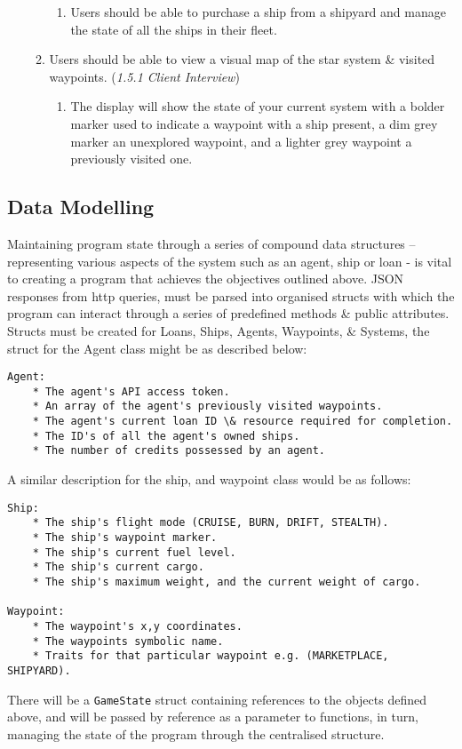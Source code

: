 \begin{enumerate}
\begin{enumerate}
\begin{enumerate}
                \item Users should be able to purchase a ship from a shipyard and manage the state of all the ships in their fleet.
            \end{enumerate}
        \item Users should be able to view a visual map of the star system \& visited waypoints. (\textit{1.5.1 Client Interview})
            \begin{enumerate}
                \item The display will show the state of your current system with a bolder marker  used to indicate a waypoint with a ship present, a dim grey marker an unexplored waypoint, and a lighter grey waypoint a previously visited one.
            \end{enumerate}
    \end{enumerate}
    \end{enumerate}

\subsection{Data Modelling}
Maintaining program state through a series of compound data structures – representing various aspects of the system such as an agent, ship or loan - is vital to creating a program that achieves the objectives outlined above. JSON responses from http queries, must be parsed into organised structs with which the program can interact through a series of predefined methods \& public attributes. Structs must be created for Loans, Ships, Agents, Waypoints, \& Systems, the struct for the Agent class might be as described below:
\begin{lstlisting}
Agent:
    * The agent's API access token.
    * An array of the agent's previously visited waypoints.
    * The agent's current loan ID \& resource required for completion.
    * The ID's of all the agent's owned ships.
    * The number of credits possessed by an agent.
\end{lstlisting}
A similar description for the ship, and waypoint class would be as follows:
\begin{lstlisting}
Ship:
    * The ship's flight mode (CRUISE, BURN, DRIFT, STEALTH).
    * The ship's waypoint marker.
    * The ship's current fuel level.
    * The ship's current cargo.
    * The ship's maximum weight, and the current weight of cargo.

Waypoint:
    * The waypoint's x,y coordinates.
    * The waypoints symbolic name.
    * Traits for that particular waypoint e.g. (MARKETPLACE, SHIPYARD).
\end{lstlisting}
There will be a \texttt{GameState} struct containing references to the objects defined above, and will be passed by reference as a parameter to functions, in turn, managing the state of the program through the centralised structure. 